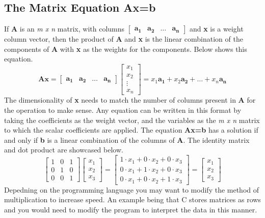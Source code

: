 \documentclass[12pt]{article}
\begin{document}
\subsection{The Matrix Equation Ax=b}
If \textbf{A} is an \textit{m x n} matrix, with columns $\begin{bmatrix}
    \mathbf{a_1} & \mathbf{a_2} & \mathbf{\dots} & \mathbf{a_n}
\end{bmatrix}$ %
and \textbf{x} is a weight column vector, then the product of \textbf{A} and \textbf{x} is the linear combination of the components of %
\textbf{A} with \textbf{x} as the weights for the components. Below shows this equation.
$$
    \boldsymbol{Ax} = 
    \begin{bmatrix}
        \mathbf{a_1} & \mathbf{a_2} & \mathbf{\dots} & \mathbf{a_n}
    \end{bmatrix}
    \begin{bmatrix}
        x_1\\
        x_2\\
        \vdots\\
        x_n
    \end{bmatrix} = x_1\mathbf{a_1} + x_2\mathbf{a_2} + \mathbf{\dots} + x_n\mathbf{a_n}
$$
\newline
The dimensionality of \textbf{x} needs to match the number of columns present in \textbf{A} for the operation to make sense. Any equation can be written in this format %
by taking the coefficients as the weight vector, and the variables as the \textit{m x n} matrix to which the scalar coefficients are applied. The equation \textbf{Ax=b} %
has a solution if and only if \textbf{b} is a linear combination of the columns of \textbf{A}.
\newline
\newline
The identity matrix and dot product are showcased below.
$$
\begin{bmatrix}
    1 & 0 & 1\\
    0 & 1 & 0\\
    0 & 0 & 1
\end{bmatrix} \begin{bmatrix}
    x_1\\
    x_2\\
    x_3
\end{bmatrix} = \begin{bmatrix}
    1\cdot x_1 + 0\cdot x_2 + 0\cdot x_3\\
    0\cdot x_1 + 1\cdot x_2 + 0\cdot x_3\\
    0\cdot x_1 + 0\cdot x_2 + 1\cdot x_3
\end{bmatrix} = \begin{bmatrix}
    x_1\\
    x_2\\
    x_3
\end{bmatrix}
$$
\newline
Depedning on the programming language you may want to modify the method of multiplication to increase speed. An example being that C stores matrices as rows and you would %
need to modify the program to interpret the data in this manner. 
\end{document}

